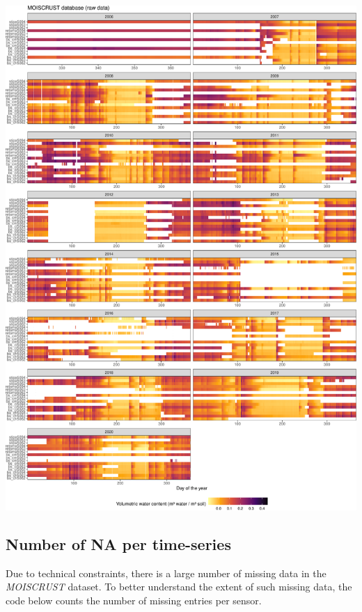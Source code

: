 \documentclass[]{article}
\begin{document}
\includegraphics{moiscrust_files/figure-latex/unnamed-chunk-8-1.pdf}

\hypertarget{number-of-na-per-time-series}{%
\subsection{Number of NA per
time-series}\label{number-of-na-per-time-series}}

Due to technical constraints, there is a large number of missing data in
the \emph{MOISCRUST} dataset. To better understand the extent of such
missing data, the code below counts the number of missing entries per
sensor.
\end{document}
